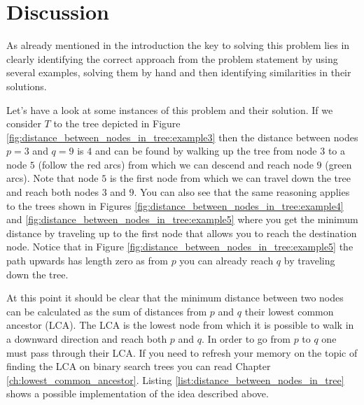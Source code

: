 \section{Discussion}
\label{distance_between_nodes_in_tree:sec:discussion}
As already mentioned in the introduction the key to solving this problem lies in clearly identifying the correct approach from the problem statement by using several examples, solving them by hand
and then identifying similarities in their solutions.

Let's have a look at some instances of this problem and their solution. If we consider $T$ to the
tree depicted in Figure \ref{fig:distance_between_nodes_in_tree:example3} then the distance between
nodes $p=3$ and $q=9$ is $4$ and  
can be found by walking up the tree from node $3$ to a node $5$ (follow the red arcs) from which
we can descend and reach  node $9$ (green arcs). Note that node $5$ is the first node from which
we can travel down the tree and reach both nodes $3$ and $9$. You can also see that the same
reasoning applies to the trees shown in Figures
\ref{fig:distance_between_nodes_in_tree:example4} and
\ref{fig:distance_between_nodes_in_tree:example5} where you get the minimum distance by traveling up
to the first node that allows you to reach the destination node. Notice that in Figure
\ref{fig:distance_between_nodes_in_tree:example5} the path upwards has length zero as from $p$ you
can already reach $q$ by traveling down the tree.

At this point it should be clear that the minimum distance between two nodes can be calculated as the
sum of distances from $p$ and $q$ their lowest common ancestor (LCA). The LCA is the lowest node
from which it is possible to walk in a downward direction and reach both $p$ and $q$. In order to go
from $p$ to $q$ one must pass through their LCA. If you need to refresh your memory on the topic of
finding the LCA on binary search trees you can read Chapter \ref{ch:lowest_common_ancestor}. Listing
\ref{list:distance_between_nodes_in_tree} shows a possible implementation of the idea described
above. 


